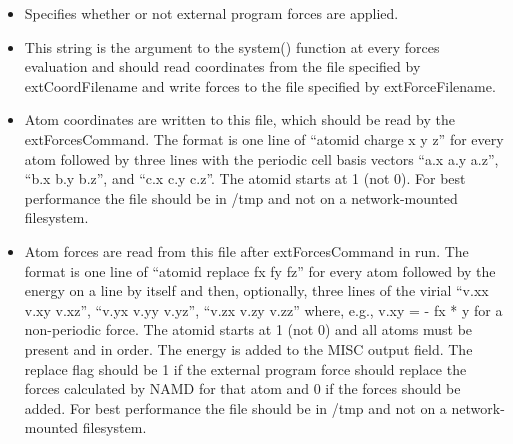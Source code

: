 \begin{itemize}

\item
{}
{Specifies whether or not external program forces are applied.}

\item
{}
{This string is the argument to the system() function at every forces
evaluation and should
read coordinates from the file specified by extCoordFilename and
write forces to the file specified by extForceFilename.
}

\item
{}
{
Atom coordinates are written to this file, which should be read by
the extForcesCommand.  The format is one line of ``atomid charge x y z''
for every atom followed by three lines with the periodic cell basis
vectors ``a.x a.y a.z'', ``b.x b.y b.z'', and ``c.x c.y c.z''.
The atomid starts at 1 (not 0).
For best performance the file should be in /tmp and not on a
network-mounted filesystem.
}

\item
{}
{
Atom forces are read from this file after extForcesCommand in run.
The format is one line of ``atomid replace fx fy fz'' for every
atom followed by the energy on a line by itself and then, optionally,
three lines of the virial ``v.xx v.xy v.xz'', ``v.yx v.yy v.yz'',
``v.zx v.zy v.zz'' where, e.g., v.xy = - fx * y for a non-periodic force.
The atomid starts at 1 (not 0) and all atoms must be present and in order.
The energy is added to the MISC output field.
The replace flag should be 1 if the external program force should replace the
forces calculated by NAMD for that atom and 0 if the forces should be added.
For best performance the file should be in /tmp and not on a
network-mounted filesystem.
}

\end{itemize}


